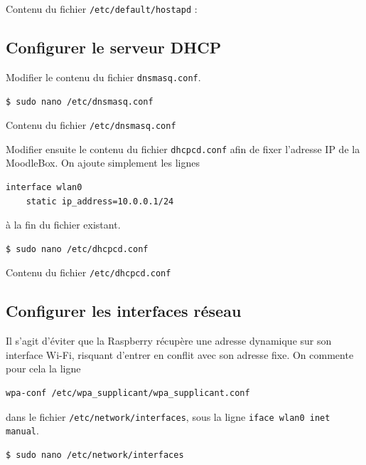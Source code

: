 \documentclass[11pt]{article}
\begin{document}
Contenu du fichier \lstinline{/etc/default/hostapd} :



\subsection{Configurer le serveur DHCP}

Modifier le contenu du fichier \lstinline{dnsmasq.conf}.

\begin{lstlisting}[language=bash]
$ sudo nano /etc/dnsmasq.conf
\end{lstlisting}

Contenu du fichier \lstinline{/etc/dnsmasq.conf}



Modifier ensuite le contenu du fichier \lstinline{dhcpcd.conf} afin de fixer l'adresse IP de la MoodleBox. On ajoute simplement les lignes
\begin{lstlisting}[language=bash]
interface wlan0
    static ip_address=10.0.0.1/24
\end{lstlisting}
à la fin du fichier existant.

\begin{lstlisting}[language=bash]
$ sudo nano /etc/dhcpcd.conf
\end{lstlisting}

Contenu du fichier \lstinline{/etc/dhcpcd.conf}




\subsection{Configurer les interfaces réseau}

Il s'agit d'éviter que la Raspberry récupère une adresse dynamique sur son interface Wi-Fi, risquant d'entrer en conflit avec son adresse fixe. On commente pour cela la ligne
\begin{lstlisting}[language=bash]
wpa-conf /etc/wpa_supplicant/wpa_supplicant.conf
\end{lstlisting}
dans le fichier \lstinline{/etc/network/interfaces}, sous la ligne \lstinline{iface wlan0 inet manual}.

\begin{lstlisting}[language=bash]
$ sudo nano /etc/network/interfaces
\end{lstlisting}
\end{document}
